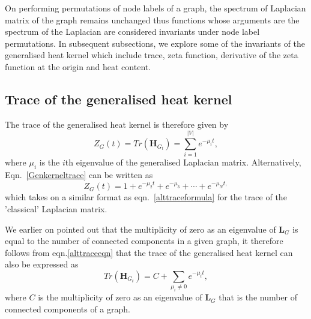 \documentclass[10pt,a4paper]{article}
\theoremstyle{plain}
\theoremstyle{definition}
\begin{document}
        On performing permutations of node labels of a graph, the spectrum of Laplacian matrix of the graph remains unchanged thus functions whose arguments are the spectrum of the Laplacian are considered invariants under node label permutations. In subsequent subsections, we explore some of the invariants of the generalised heat kernel which include trace, zeta function, derivative of the zeta function at the origin and heat content.
        
        \subsection{Trace of the generalised heat kernel}
        The trace of the generalised heat kernel is therefore given by
        \begin{equation}
        Z_{G}(t) = Tr(\mathbf{H}_{G_t}) = \sum_{i=1}^{|V|} e^{-\mu_i t},
        \label{Genkerneltrace}
        \end{equation}
         where $\mu_{i}$ is the $i$th eigenvalue of the generalised Laplacian matrix.
        Alternatively, Eqn.~\ref{Genkerneltrace} can be written as 
        \begin{equation}
        Z_{G}(t) =  1+ e^{-\mu_{2} t} + e^{-\mu_{3}} + \cdots + e^{-\mu_{N} t,}
        \label{alttraceeqn}
        \end{equation}
        which takes on a similar format as eqn.~\ref{alttraceformula} for the trace of the 'classical' Laplacian matrix.
        
        We earlier on pointed out that the multiplicity of zero as an eigenvalue of $\mathbf{L}_G$ is equal to the number of connected components in a given graph, it therefore follows from eqn.\ref{alttraceeqn} that 
        the trace of the generalised heat kernel can also be expressed as 
        \begin{equation}
        Tr(\mathbf{H}_{G_t}) = C + \sum_{\mu_i \neq 0} e^{-\mu_i t}
        \label{kernelexp2},
        \end{equation}
        where $C$ is the multiplicity of zero as an eigenvalue of $\mathbf{L}_G$ that is the number of connected components of a graph.
        
\end{document}
